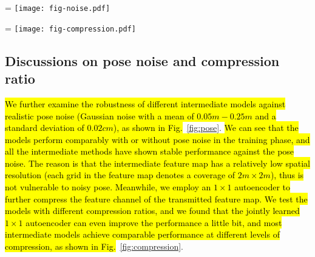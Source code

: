 \begin{figure*}[t]
\begin{center}
\hsize=\textwidth
\texttt{[image: fig-noise.pdf]}
\caption{\hl{Experimental results of a robustness test conducted under various magnitudes of pose noise. AUG. means augmentation which adds pose noise during training.}}
\label{fig:pose}
\end{center}
\end{figure*}

\begin{figure*}[t]
\begin{center}
\hsize=\textwidth
\texttt{[image: fig-compression.pdf]}
\caption{\hl{Experimental results of a bandwidth test conducted under various compression ratios. }}
\label{fig:compression}
\end{center}
\vspace{-5mm}
\end{figure*}

\subsection{Discussions on pose noise and compression ratio}
\hl{We further examine the robustness of different intermediate models against realistic pose noise (Gaussian noise with a mean of $0.05m-0.25m$ and a standard deviation of $0.02cm$), as shown in Fig.}~\ref{fig:pose}. \hl{We can see that the models perform comparably with or without pose noise in the training phase, and all the intermediate methods have shown stable performance against the pose noise. The reason is that the intermediate feature map has a relatively low spatial resolution (each grid in the feature map denotes a coverage of $2m\times2m$), thus is not vulnerable to noisy pose. Meanwhile, we employ an $1\times1$ autoencoder to further compress the feature channel of the transmitted feature map. We test the models with different compression ratios, and we found that the jointly learned $1\times1$ autoencoder can even improve the performance a little bit, and most intermediate models achieve comparable performance at different levels of compression, as shown in Fig.}~\ref{fig:compression}.

